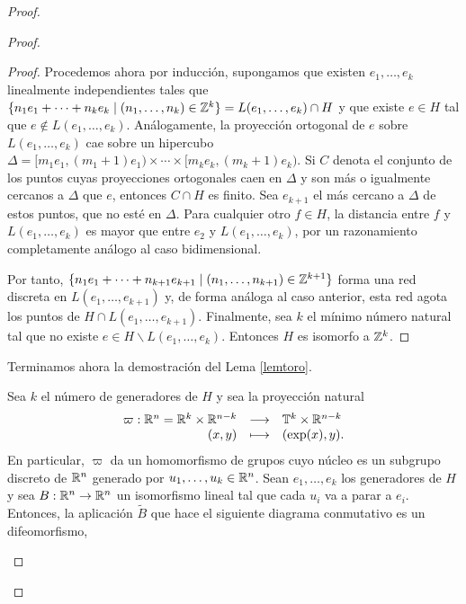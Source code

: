 \begin{proof}
\begin{proof}
\begin{proof}
      Procedemos ahora por inducción, supongamos que existen $e_1,\dots,e_k$ linealmente independientes tales que $\{n_1e_1+\cdots+n_ke_k \mid (n_1,\dots,n_k) \in \mathbb{Z}^k \} = L(e_1,\dots,e_k) \cap H$ y que existe $e\in H$ tal que $e \not\in L(e_1,\dots,e_k)$. Análogamente, la proyección ortogonal de $e$ sobre $L(e_1,\dots,e_k)$ cae sobre un hipercubo $\Delta=[m_1e_1,(m_1+1)e_1) \times \cdots \times [m_ke_k,(m_k+1)e_k)$. Si $C$ denota el conjunto de los puntos cuyas proyecciones ortogonales caen en $\Delta$ y son más o igualmente cercanos a $\Delta$ que $e$, entonces $C \cap H$ es finito. Sea $e_{k+1}$ el más cercano a $\Delta$ de estos puntos, que no esté en $\Delta$. Para cualquier otro $f \in H$, la distancia entre $f$ y $L(e_1,\dots,e_k)$ es mayor que entre $e_2$ y $L(e_1,\dots,e_k)$, por un razonamiento completamente análogo al caso bidimensional. 

	Por tanto, $\{n_1e_1+\dots+n_{k+1}e_{k+1} \mid (n_1,\dots,n_{k+1}) \in \mathbb{Z}^{k+1}\}$ forma una red discreta en $L(e_1,\dots,e_{k+1})$ y, de forma análoga al caso anterior, esta red agota los puntos de $H\cap L(e_1,\dots,e_{k+1})$.
	Finalmente, sea $k$ el mínimo número natural tal que no existe $e \in H \backslash L(e_1,\dots,e_k)$. Entonces $H$ es isomorfo a $\mathbb{Z}^k$.
\end{proof}

Terminamos ahora la demostración del Lema \ref{lemtoro}.
 
  Sea $k$ el número de generadores de $H$ y sea la proyección natural
  \[
    \begin{array}{rcl}
      \varpi: \mathbb{R}^n = \mathbb{R}^k \times \mathbb{R}^{n-k} & \longrightarrow & \mathbb{T}^k \times \mathbb{R}^{n-k} \\
      (x,y) & \longmapsto & (\exp(x), y).
    \end{array}
  \]
  En particular, $\varpi$ da un homomorfismo de grupos cuyo núcleo es un subgrupo discreto de $\mathbb{R}^n$ generado por $u_1,\dots,u_k \in \mathbb{R}^n$. 
  Sean $e_1,\dots,e_k$ los generadores de $H$ y sea $B:\mathbb{R}^n \rightarrow \mathbb{R}^n$ un isomorfismo lineal tal que cada $u_i$ va a parar a $e_i$. Entonces, la aplicación $\tilde{B}$ que hace el siguiente diagrama conmutativo es un difeomorfismo,
  \begin{center}
   \end{center}
  

\end{proof}
\end{proof}

